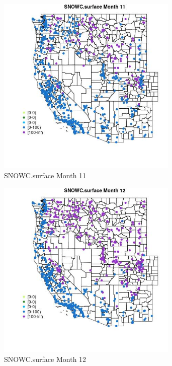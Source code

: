 \begin{figure} 
\centering  
\includegraphics[width=0.77\textwidth]{Code_Outputs/Report_ML_input_PM25_Step4_part_f_de_duplicated_aveswNAs_MapObsMo11SNOWCsurface.jpg} 
\caption{\label{fig:Report_ML_input_PM25_Step4_part_f_de_duplicated_aveswNAsMapObsMo11SNOWCsurface}SNOWC.surface Month 11} 
\end{figure} 
 

\begin{figure} 
\centering  
\includegraphics[width=0.77\textwidth]{Code_Outputs/Report_ML_input_PM25_Step4_part_f_de_duplicated_aveswNAs_MapObsMo12SNOWCsurface.jpg} 
\caption{\label{fig:Report_ML_input_PM25_Step4_part_f_de_duplicated_aveswNAsMapObsMo12SNOWCsurface}SNOWC.surface Month 12} 
\end{figure} 
 


